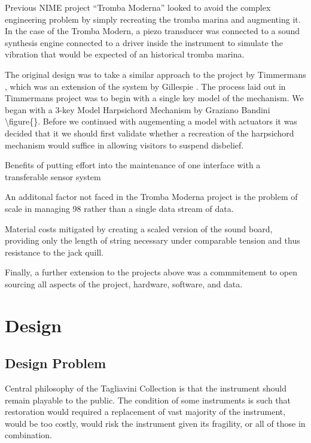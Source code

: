 Previous NIME project ``Tromba Moderna'' \cite{Baldwin2016} looked to
avoid the complex engineering problem by simply recreating the tromba
marina and augmenting it. In the case of the Tromba Modern, a piezo
transducer was connected to a sound synthesis engine connected to a
driver inside the instrument to simulate the vibration that would be
expected of an historical tromba marina.

The original design was to take a similar approach to the project by
Timmermans \cite{Timmermans2020}, which was an extension of the system
by Gillespie \cite{Gillespie1996}. The process laid out in Timmermans
project was to begin with a single key model of the mechanism. We began
with a 3-key Model Harpsichord Mechanism by Graziano Bandini
\textbackslash figure\{\}. Before we continued with augementing a model
with actuators it was decided that it we should first validate whether a
recreation of the harpsichord mechanism would suffice in allowing
visitors to suspend disbelief.

Benefits of putting effort into the maintenance of one interface with a
transferable sensor system

An additonal factor not faced in the Tromba Moderna project is the
problem of scale in managing 98 rather than a single data stream of
data.

Material costs mitigated by creating a scaled version of the sound
board, providing only the length of string necessary under comparable
tension and thus resistance to the jack quill.

Finally, a further extension to the projects above was a commmitement to
open sourcing all aspects of the project, hardware, software, and data.

\section{Design}\label{design}

\subsection{Design Problem}\label{design-problem}

Central philosophy of the Tagliavini Collection is that the instrument
should remain playable to the public. The condition of some instruments
is such that restoration would required a replacement of vast majority
of the instrument, would be too costly, would risk the instrument given
its fragility, or all of those in combination.

